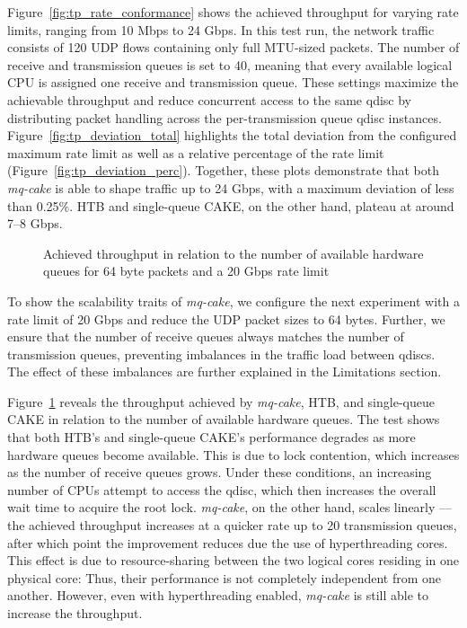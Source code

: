 Figure~\ref{fig:tp_rate_conformance} shows the achieved throughput for varying rate limits, ranging from 10 Mbps to 24 Gbps.
%
In this test run, the network traffic consists of 120 UDP flows containing only full MTU-sized packets.
%
The number of receive and transmission queues is set to 40, meaning that every available logical CPU is assigned one receive and transmission queue.
%
These settings maximize the achievable throughput and reduce concurrent access to the same qdisc by distributing packet handling across the per-transmission queue qdisc instances.
%
Figure~\ref{fig:tp_deviation_total} highlights the total deviation from the configured maximum rate limit as well as a relative percentage of the rate limit (Figure~\ref{fig:tp_deviation_perc}).
%
Together, these plots demonstrate that both \textit{mq-cake} is able to shape traffic up to 24 Gbps, with a maximum deviation of less than
0.25\%. HTB and single-queue CAKE, on the other hand, plateau at around 7--8 Gbps.

\begin{figure}[h]
    \centering
    
    \caption{Achieved throughput in relation to the number of available hardware queues for 64 byte packets and a 20 Gbps rate limit}\label{fig:scaling}
\end{figure}
To show the scalability traits of \textit{mq-cake}, we configure the next experiment with a rate limit of 20 Gbps and reduce the UDP packet sizes to 64 bytes.
%
Further, we ensure that the number of receive queues always matches the number of transmission queues, preventing imbalances in the traffic load between qdiscs.
%
The effect of these imbalances are further explained in the Limitations section.
%

Figure~\ref{fig:scaling} reveals the throughput achieved by \textit{mq-cake}, HTB, and single-queue CAKE in relation to the number of available hardware queues.
%
The test shows that both HTB's and single-queue CAKE's performance degrades as more hardware queues become available.
This is due to lock contention, which increases as the number of receive queues grows. 
Under these conditions, an increasing number of CPUs attempt to access the qdisc, which then increases the overall wait time to acquire the root lock. 
\textit{mq-cake}, on the other hand, scales linearly — the achieved throughput increases at a quicker rate up to 20 transmission
queues, after which point the improvement reduces due the use of hyperthreading cores.
This effect is due to resource-sharing between the two logical cores residing in one physical core:
Thus, their performance is not completely independent from one another.
However, even with hyperthreading enabled, \textit{mq-cake} is still able to increase the throughput.

